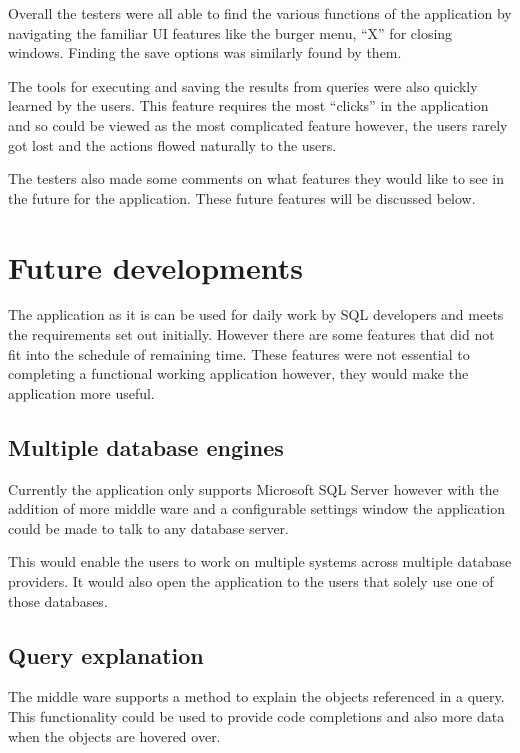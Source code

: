 Overall the testers were all able to find the various functions of
the application by navigating the familiar UI features like the burger
menu, ``X'' for closing windows. Finding the save options was
similarly found by them.

The tools for executing and saving the results from queries were also
quickly learned by the users. This feature requires the most ``clicks''
in the application and so could be viewed as the most complicated
feature however, the users rarely got lost and the actions flowed
naturally to the users.

The testers also made some comments on what features they would like to
see in the future for the application. These future features will be
discussed below.

\section{Future developments}\label{future-developments}

The application as it is can be used for daily work by SQL developers
and meets the requirements set out initially. However there are some
features that did not fit into the schedule of remaining time. These
features were not essential to completing a functional working
application however, they would make the application more useful.

\subsection{Multiple database
engines}\label{multiple-database-engines}

Currently the application only supports Microsoft SQL Server however
with the addition of more middle ware and a configurable settings window
the application could be made to talk to any database server.

This would enable the users to work on multiple systems across multiple
database providers. It would also open the application to the users that
solely use one of those databases.

\subsection{Query explanation}\label{query-explanation}

The middle ware supports a method to explain the objects referenced in a
query. This functionality could be used to provide code completions and
also more data when the objects are hovered over.

